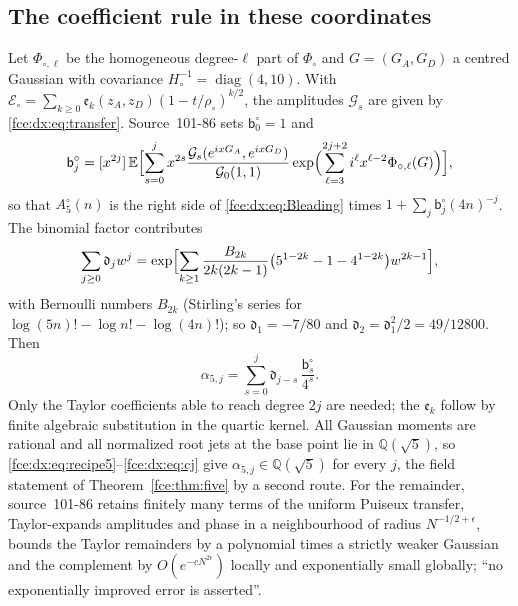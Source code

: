 \documentclass[11pt,a4paper]{article}
\numberwithin{equation}{section}
\theoremstyle{definition}\newtheorem{definition}[theorem]{Definition}
\theoremstyle{remark}\newtheorem{remark}[theorem]{Remark}
\newcommand{\Q}{\mathbb Q}
\newcommand{\E}{\mathcal E}
\newcommand{\Exp}{\mathbb E}
\begin{document}
\subsection{The coefficient rule in these coordinates}\label{fce:dx:sec:recipe5}
Let $\Phi_{\circ,\ell}$ be the homogeneous degree-$\ell$ part of $\Phi_\circ$ and
$G=(G_A,G_D)$ a centred Gaussian with covariance
$H_\circ^{-1}=\operatorname{diag}(4,10)$. With
$\E_\circ=\sum_{k\ge0}\mathfrak e_k(z_A,z_D)(1-t/\rho_\circ)^{k/2}$, the
amplitudes $\mathcal G_s$ are given by \eqref{fce:dx:eq:transfer}. Source~101-86
sets $\mathsf b^\circ_0=1$ and
\begin{equation}\label{fce:dx:eq:recipe5}
 \mathsf b^\circ_j=[x^{2j}]\,\Exp\Bigl[\sum_{s=0}^jx^{2s}
 \frac{\mathcal G_s(e^{ixG_A},e^{ixG_D})}{\mathcal G_0(1,1)}
 \exp\Bigl(\sum_{\ell=3}^{2j+2}i^\ell x^{\ell-2}\Phi_{\circ,\ell}(G)\Bigr)\Bigr],
\end{equation}
so that $A^\circ_5(n)$ is the right side of \eqref{fce:dx:eq:Bleading} times
$1+\sum_j\mathsf b^\circ_j(4n)^{-j}$. The binomial factor contributes
\begin{equation}\label{fce:dx:eq:dj}
 \sum_{j\ge0}\mathfrak d_jw^j=\exp\Bigl[\sum_{k\ge1}\frac{B_{2k}}{2k(2k-1)}
 \bigl(5^{1-2k}-1-4^{1-2k}\bigr)w^{2k-1}\Bigr],
\end{equation}
with Bernoulli numbers $B_{2k}$ (Stirling's series for
$\log(5n)!-\log n!-\log(4n)!$); so $\mathfrak d_1=-7/80$ and
$\mathfrak d_2=\mathfrak d_1^2/2=49/12800$. Then
\begin{equation}\label{fce:dx:eq:cj}
 \alpha_{5,j}=\sum_{s=0}^j\mathfrak d_{j-s}\,\frac{\mathsf b^\circ_s}{4^s}.
\end{equation}
Only the Taylor coefficients able to reach degree $2j$ are needed; the
$\mathfrak e_k$ follow by finite algebraic substitution in the quartic
kernel. All Gaussian moments are rational and all normalized root jets at the
base point lie in $\Q(\sqrt5)$, so \eqref{fce:dx:eq:recipe5}--\eqref{fce:dx:eq:cj}
give $\alpha_{5,j}\in\Q(\sqrt5)$ for every $j$, the field statement of
Theorem~\ref{fce:thm:five} by a second route. For the remainder,
source~101-86 retains finitely many terms of the uniform Puiseux transfer,
Taylor-expands amplitudes and phase in a neighbourhood of radius
$N^{-1/2+\epsilon}$, bounds the Taylor remainders by a polynomial times a
strictly weaker Gaussian and the complement by $O(e^{-cN^{2\epsilon}})$
locally and exponentially small globally; ``no exponentially improved error
is asserted''.
\end{document}
